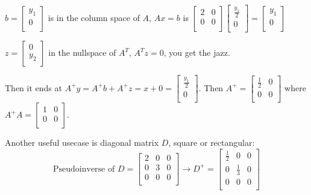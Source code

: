 \(b = 
\begin{bmatrix}
     y_1 \\
     0 \\
\end{bmatrix}\) is in the column space of \(A\), \(Ax = b\) is \(\begin{bmatrix}
    2 & 0  \\
    0 & 0  \\
\end{bmatrix}
 \begin{bmatrix}
     \frac{y_1}{2} \\
     0 \\
 \end{bmatrix}
 = 
 \begin{bmatrix}
     y_1 \\
     0 \\
 \end{bmatrix}\)  

 \(z = \begin{bmatrix}
     0 \\
     y_2 \\
 \end{bmatrix}\) in the nullspace of \(A^T\), \(A^T z = 0\), you get the jazz. 
 
 Then it ends at \(A^+ y = A^+ b + A^+ z = x + 0 = \begin{bmatrix}
     \frac{y_1}{2} \\
     0 \\
 \end{bmatrix}\). Then \(A^+ = \begin{bmatrix}
    \frac{1}{2} & 0  \\
    0 & 0  \\
 \end{bmatrix}\)  
 where 
 \(A^+ A = \begin{bmatrix}
    1 &  0 \\
    0 &  0 \\
 \end{bmatrix}\). 

 Another useful usecase is diagonal matrix \(D\), square or rectangular: 
 \[
    \text{Pseudoinverse of } D = 
    \begin{bmatrix}
        2 & 0 & 0  \\
        0 & 3 & 0  \\
        0 & 0 & 0  \\
    \end{bmatrix}
    \rightarrow
    D^+ = 
    \begin{bmatrix}
        \frac{1}{2} & 0 & 0  \\
        0 & \frac{1}{3} & 0  \\
        0 & 0 & 0  \\
    \end{bmatrix}
 \] 


